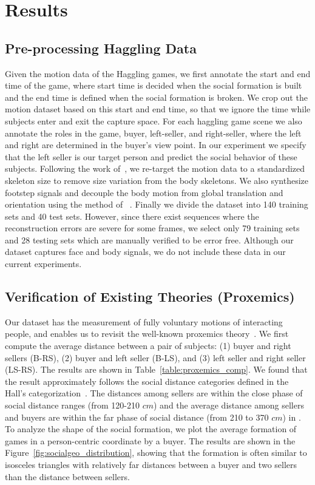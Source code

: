 
\section{Results}
\subsection{Pre-processing Haggling Data}
Given the motion data of the Haggling games, we first annotate the start and end time of the game, where start time is decided when the social formation is built and the end time is defined when the social formation is broken. We crop out the motion dataset based on this start and end time, so that we ignore the time while subjects enter and exit the capture space. For each haggling game scene we also annotate the roles in the game, buyer, left-seller, and right-seller, where the left and right are determined in the buyer's view point. In our experiment we specify that the left seller is our target person and predict the social behavior of these subjects. Following the work of~\cite{holden2016deep}, we re-target the motion data to a standardized skeleton size to remove size variation from the body skeletons. We also synthesize footstep signals and decouple the body motion from global translation and orientation using the method of ~\cite{holden2016deep}. Finally we divide the dataset into 140 training sets and 40 test sets. However, since there exist sequences where the reconstruction errors are severe for some frames, we select only 79 training sets and 28 testing sets which are manually verified to be error free. Although our dataset captures face and body signals, we do not include these data in our current experiments. 


\subsection{Verification of Existing Theories (Proxemics)}
Our dataset has the measurement of fully voluntary motions of interacting people, and enables us to revisit the well-known proxemics theory~\cite{Hall66}. We first compute the average distance between a pair of subjects: (1) buyer and right sellers (B-RS), (2) buyer and left seller (B-LS), and (3) left seller and right seller (LS-RS). The results are shown in Table~\ref{table:proxemics_comp}. We found that the result approximately follows the social distance categories defined in the Hall's categorization~\cite{Hall66}. The distances among sellers are within the close phase of social distance ranges (from 120-210 $cm$) and the average distance among sellers and buyers are within the far phase of social distance (from 210 to 370 $cm$) in \cite{Hall66}. To analyze the shape of the social formation, we plot the average formation of games in a person-centric coordinate by a buyer. The results are shown in the Figure~\ref{fig:socialgeo_distribution}, showing that the formation is often similar to isosceles triangles with relatively far distances between a buyer and two sellers than the distance between sellers. 


